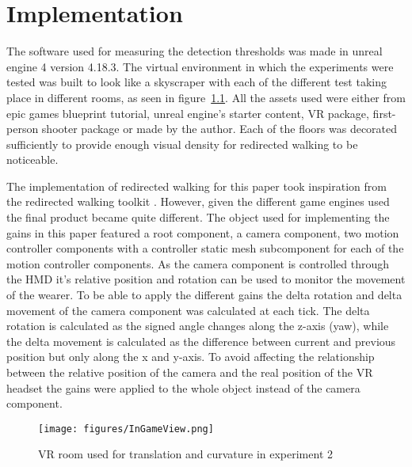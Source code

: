 \chapter{Implementation}
\label{chap:implementation}

The software used for measuring the detection thresholds was made in unreal engine 4 version 4.18.3. The virtual environment in which the experiments were tested was built to look like a skyscraper with each of the different test taking place in different rooms, as seen in figure~\ref{fig:game_room}. All the assets used were either from epic games blueprint tutorial, unreal engine's starter content, VR package, first-person shooter package or made by the author. Each of the floors was decorated sufficiently to provide enough visual density \cite{paludan2016disguising} for redirected walking to be noticeable.

The implementation of redirected walking for this paper took inspiration from the redirected walking toolkit \cite{azmandian2016redirected}. However, given the different game engines used the final product became quite different. The object used for implementing the gains in this paper featured a root component, a camera component, two motion controller components with a controller static mesh subcomponent for each of the motion controller components. As the camera component is controlled through the HMD it's relative position and rotation can be used to monitor the movement of the wearer. To be able to apply the different gains the delta rotation and delta movement of the camera component was calculated at each tick. The delta rotation is calculated as the signed angle changes along the z-axis (yaw), while the delta movement is calculated as the difference between current and previous position but only along the x and y-axis. To avoid affecting the relationship between the relative position of the camera and the real position of the VR headset the gains were applied to the whole object instead of the camera component.

\begin{figure}
    \centering
    \texttt{[image: figures/InGameView.png]}
    \caption{VR room used for translation and curvature in experiment 2}
    \label{fig:game_room}
\end{figure}

